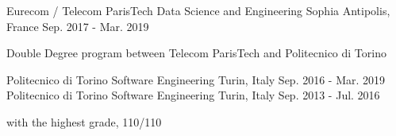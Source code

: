 

\begin{cventries}

  \cventry
    {Eurecom / Telecom ParisTech} %
    { Data Science and Engineering} %
    {Sophia Antipolis, France} %
    {Sep. 2017 - Mar. 2019} %
    {
      \begin{cvitems} %
        \item {Double Degree program between Telecom ParisTech and Politecnico di Torino}
      \end{cvitems} %
    }
	\cventry
	  {Politecnico di Torino}
	  { Software Engineering}
	  {Turin, Italy}
	  {Sep. 2016 - Mar. 2019}
	  {} 
	\cventry
	  {Politecnico di Torino}
 	  { Software Engineering}
	  {Turin, Italy}
	  {Sep. 2013 - Jul. 2016}
	  {
	    \begin{cvitems}
		  \item {with the highest grade, 110/110}
	    \end{cvitems}
	  }

\end{cventries}
